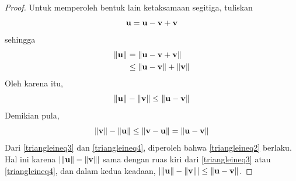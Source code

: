 \begin{proof}
Untuk memperoleh bentuk lain ketaksamaan segitiga, tuliskan
\begin{equation*}
\mathbf{u}=\mathbf{u}-\mathbf{v}+\mathbf{v}
\end{equation*}
sehingga
\begin{align*}
\| \mathbf{u}\| & =\| \mathbf{u}-\mathbf{v}+\mathbf{v}\| \\
& \leq \| \mathbf{u}-\mathbf{v}\| +\| \mathbf{v}\|
\end{align*}
Oleh karena itu,
\begin{equation}
\| \mathbf{u}\| -\| \mathbf{v}\| \leq \| \mathbf{u}-\mathbf{v}
\|  \label{triangleineq3}
\end{equation}
Demikian pula,
\begin{equation}
\| \mathbf{v}\| -\| \mathbf{u}\| \leq \| \mathbf{v}-\mathbf{u}
\| =\| \mathbf{u}-\mathbf{v}\|  \label{triangleineq4}
\end{equation}
Dari \ref{triangleineq3} dan \ref{triangleineq4}, diperoleh bahwa \ref{triangleineq2} berlaku. Hal ini
karena $\left| \| \mathbf{u}\| -\| \mathbf{v}\|
\right| $ sama dengan ruas kiri dari \ref{triangleineq3} atau \ref{triangleineq4}, dan
dalam kedua keadaan, $\left| \| \mathbf{u}\| -\| \mathbf{v}\|
\right| \leq \| \mathbf{u}-\mathbf{v}\| $.
\end{proof}
\fi
